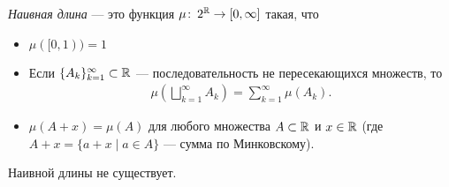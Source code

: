 \begin{df}
 \textit{Наивная длина} --- это функция $ \mu \colon\, 2^\mathbb{R} \to [0,\infty] $ такая, что
 \begin{itemize}
  \item $ \mu ([0, 1)) = 1 $
  \item Если $\{A_{k}\}_{k=1}^{\infty} \subset \mathbb{R} $  --- последовательность не пересекающихся множеств, то
   \begin{align*}
    \mu \left( \bigsqcup_{k=1}^{\infty} A_k \right) = \sum_{k=1}^{\infty} \mu(A_k)
   .\end{align*} 
  \item $ \mu(A + x) = \mu(A) $ для любого множества $ A \subset \mathbb{R} $ и $ x \in \mathbb{R} $ (где $ A + x = \{ a + x \mid a \in A \} $ --- сумма по Минковскому).
 \end{itemize}
\end{df}
\begin{thm}
 Наивной длины не существует.
\end{thm}
